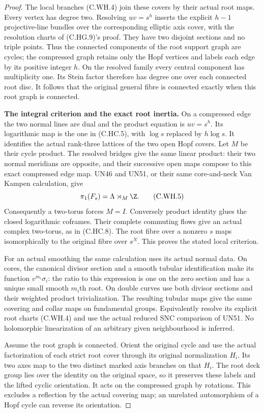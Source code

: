 \begin{proof}
The local branches (C.WH.4) join these
covers by their actual root maps.
Every vertex has degree two. Resolving
$uv=s^h$ inserts the explicit $h-1$
projective-line bundles over the
corresponding elliptic axis cover,
with the resolution charts of
(C.HG.9)'s proof. They have two
disjoint sections and no triple
points. Thus the connected components
of the root support graph are cycles;
the compressed graph retains only
the Hopf vertices and labels each
edge by its positive integer $h$.
On the resolved family every central
component has multiplicity one.
Its Stein factor therefore has degree
one over each connected root disc.
It follows that the original general
fibre is connected exactly when this
root graph is connected.

\par\medskip\noindent\textbf{The integral criterion and the exact root inertia.}
On a compressed edge the two normal
lines are dual and the product equation
is $uv=s^h$. Its logarithmic map is
the one in (C.HC.5), with $\log s$
replaced by $h\log s$. It identifies
the actual rank-three lattices of
the two open Hopf covers. Let $M$
be their cycle product. The resolved
bridges give the same linear product:
their two normal meridians are
opposite, and their successive open
maps compose to this exact compressed
edge map. UN46 and UN51, or their
same core-and-neck Van Kampen
calculation, give
\[
                  \pi_1(F_s)=\Lambda\rtimes_M\Z.
\tag{C.WH.5}
\]
Consequently a two-torus forces $M=I$.
Conversely product identity glues
the closed logarithmic coframes.
Their complete commuting flows give
an actual complex two-torus, as in
(C.HC.8). The root fibre over a
nonzero $s$ maps isomorphically to
the original fibre over $s^N$.
This proves the stated local criterion.

For an actual smoothing the same
calculation uses its actual normal
data. On cores, the canonical divisor
section and a smooth tubular
identification make its function
$v^{m_i}\sigma_i$: the ratio to this
expression is one on the zero
section and has a unique small smooth
$m_i$th root. On double curves use
both divisor sections and their
weighted product trivialization.
The resulting tubular maps give the
same covering and collar maps on
fundamental groups. Equivalently
resolve its explicit root charts
(C.WH.4) and use the actual reduced
SNC comparison of UN51. No holomorphic
linearization of an arbitrary given
neighbourhood is inferred.

Assume the root graph is connected.
Orient the original cycle and use
the actual factorization of each
strict root cover through its
original normalization $H_i$.
Its two axes map to the two distinct
marked axis branches on that $H_i$.
The root deck group lies over the
identity on the original space,
so it preserves these labels and
the lifted cyclic orientation.
It acts on the compressed graph
by rotations. This excludes a
reflection by the actual covering
map; an unrelated automorphism of
a Hopf cycle can reverse its
orientation.


\end{proof}

